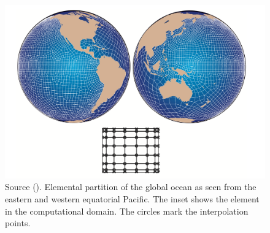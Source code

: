 \documentclass[11pt,a4paper]{article}
\begin{document}
	\begin{figure}[H]
	    \centering 
	    \includegraphics[width=13cm]{semGrid.png}
	    \caption{Source (\cite{iskandarani2002multi}). Elemental partition of the global ocean as seen from the eastern and western equatorial Pacific. The inset shows the element in the computational domain. The circles mark the interpolation points.}
	    \label{fig:5}
	\end{figure}
	
	
	
	
\end{document}
